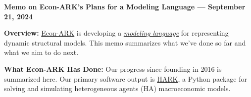 \documentclass[12pt,pdftex,letterpaper]{article}
\begin{document}
\begin{center}
	\textbf{Memo on Econ-ARK's Plans for a Modeling Language --- September 21, 2024}
\end{center}

\noindent \textbf{Overview:} \href{https://econ-ark.org/}{Econ-ARK} is developing a \href{https://ampl.com/wp-content/uploads/amlopt.pdf}{\textit{modeling language}} for representing dynamic structural models.  This memo summarizes what we've done so far and what we aim to do next.

\vspace{0.35cm}

\noindent \textbf{What Econ-ARK Has Done:} Our progress since founding in 2016 is summarized here. Our primary software output is \href{https://github.com/econ-ark/HARK}{HARK}, a Python package for solving and simulating heterogeneous agents (HA) macroeconomic models.
\end{document}
